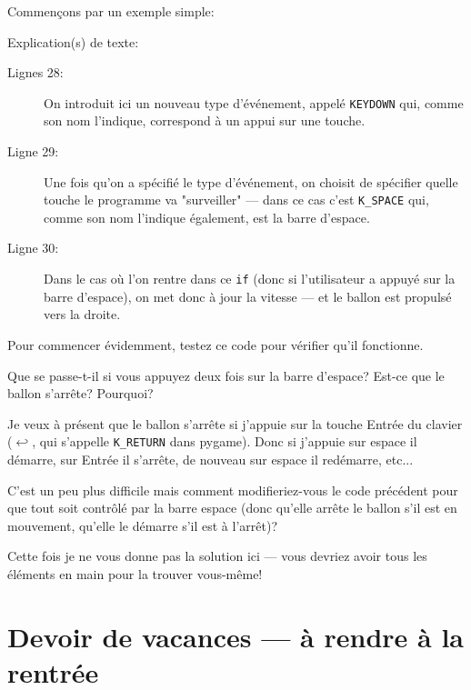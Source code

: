 \documentclass[11pt]{article}
\begin{document}
	Commençons par un exemple simple:
	
	\label{DemarBall}
	
	Explication(s) de texte:
	\begin{description}
		\item[Lignes 28:] On introduit ici un nouveau type d'événement, appelé \texttt{KEYDOWN} qui, comme son nom l'indique, correspond à un appui sur une touche.
		\item[Ligne 29:] Une fois qu'on a spécifié le type d'événement, on choisit de spécifier quelle touche le programme va "surveiller" --- dans ce cas c'est \texttt{K\_SPACE} qui, comme son nom l'indique également, est la barre d'espace.
		\item[Ligne 30:] Dans le cas où l'on rentre dans ce \texttt{if} (donc si l'utilisateur a appuyé sur la barre d'espace), on met donc à jour la vitesse --- et le ballon est propulsé vers la droite.
	\end{description}
	
	\begin{MonAct}
		\begin{alphenum}
			\item Pour commencer évidemment, testez ce code pour vérifier qu'il fonctionne.
			\item Que se passe-t-il si vous appuyez deux fois sur la barre d'espace? Est-ce que le ballon s'arrête? Pourquoi?
			\item Je veux à présent que le ballon s'arrête si j'appuie sur la touche Entrée du clavier ($\hookleftarrow$, qui s'appelle \texttt{K\_RETURN} dans pygame). Donc si j'appuie sur espace il démarre, sur Entrée il s'arrête, de nouveau sur espace il redémarre, etc...
			\item C'est un peu plus difficile mais comment modifieriez-vous le code précédent pour que tout soit contrôlé par la barre espace (donc qu'elle arrête le ballon s'il est en mouvement, qu'elle le démarre s'il est à l'arrêt)?
		\end{alphenum}
		
		Cette fois je ne vous donne pas la solution ici --- vous devriez avoir tous les éléments en main pour la trouver vous-même!
	\end{MonAct}
	
	\section{Devoir de vacances --- à rendre à la rentrée}
	
\end{document}

